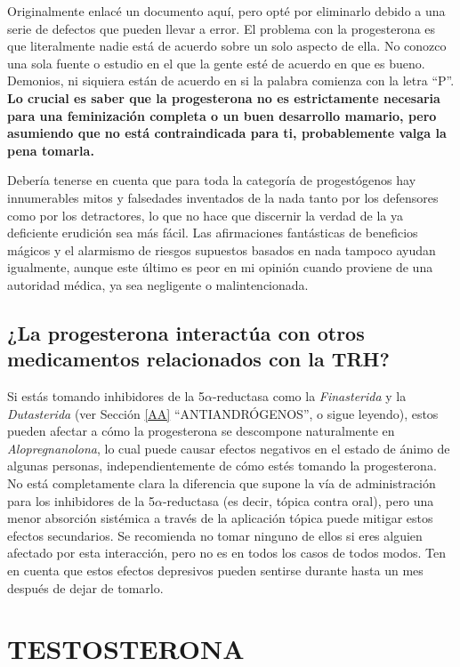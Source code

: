\documentclass{article}
\begin{document}
Originalmente enlacé un documento aquí, pero opté por eliminarlo debido a una serie de defectos que pueden llevar a error. El problema con la progesterona es que literalmente nadie está de acuerdo sobre un solo aspecto de ella. No conozco una sola fuente o estudio en el que la gente esté de acuerdo en que es bueno. Demonios, ni siquiera están de acuerdo en si la palabra comienza con la letra “P”. \textbf{Lo crucial es saber que la progesterona no es estrictamente necesaria para una feminización completa o un buen desarrollo mamario, pero asumiendo que no está contraindicada para ti, probablemente valga la pena tomarla.}

Debería tenerse en cuenta que para toda la categoría de progestógenos hay innumerables mitos y falsedades inventados de la nada tanto por los defensores como por los detractores, lo que no hace que discernir la verdad de la ya deficiente erudición sea más fácil. Las afirmaciones fantásticas de beneficios mágicos y el alarmismo de riesgos supuestos basados en nada tampoco ayudan igualmente, aunque este último es peor en mi opinión cuando proviene de una autoridad médica, ya sea negligente o malintencionada.

\subsection{¿La progesterona interactúa con otros medicamentos relacionados con la TRH?}\label{8-18}

Si estás tomando inhibidores de la 5$\alpha$-reductasa como la \textit{Finasterida} y la \textit{Dutasterida} (ver Sección \ref{AA} “ANTIANDRÓGENOS”, o sigue leyendo), estos pueden afectar a cómo la progesterona se descompone naturalmente en \textit{Alopregnanolona}, lo cual puede causar efectos negativos en el estado de ánimo de algunas personas, independientemente de cómo estés tomando la progesterona. No está completamente clara la diferencia que supone la vía de administración para los inhibidores de la 5$\alpha$-reductasa (es decir, tópica contra oral), pero una menor absorción sistémica a través de la aplicación tópica puede mitigar estos efectos secundarios. Se recomienda no tomar ninguno de ellos si eres alguien afectado por esta interacción, pero no es en todos los casos de todos modos. Ten en cuenta que estos efectos depresivos pueden sentirse durante hasta un mes después de dejar de tomarlo.


\section{TESTOSTERONA}\label{T}
\end{document}
